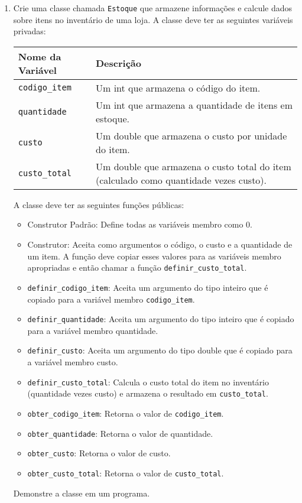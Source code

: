 \documentclass[12pt]{article}
\begin{document}
\begin{enumerate}
  \item Crie uma classe chamada \texttt{Estoque} que armazene informações e calcule dados sobre itens no inventário de uma loja. A classe deve ter as seguintes variáveis privadas:

    \begin{tabular}{|l|p{.7\linewidth}|}
      \hline
      Nome da Variável & Descrição \\
      \hline
      \texttt{codigo\_item} & Um int que armazena o código do item. \\
      \texttt{quantidade} & Um int que armazena a quantidade de itens em estoque. \\
      \texttt{custo} & Um double que armazena o custo por unidade do item. \\
      \texttt{custo\_total} & Um double que armazena o custo total do item (calculado como quantidade vezes custo). \\
      \hline
    \end{tabular}

    A classe deve ter as seguintes funções públicas:
    \begin{itemize}
      \item Construtor Padrão: Define todas as variáveis membro como 0.
      \item Construtor: Aceita como argumentos o código, o custo e a quantidade de um item. A função deve copiar esses valores para as variáveis membro apropriadas e então chamar a função \texttt{definir\_custo\_total}.
      \item \texttt{definir\_codigo\_item}: Aceita um argumento do tipo inteiro que é copiado para a variável membro \texttt{codigo\_item}.
      \item \texttt{definir\_quantidade}: Aceita um argumento do tipo inteiro que é copiado para a variável membro quantidade.
      \item \texttt{definir\_custo}: Aceita um argumento do tipo double que é copiado para a variável membro custo.
      \item \texttt{definir\_custo\_total}: Calcula o custo total do item no inventário (quantidade vezes custo) e armazena o resultado em \texttt{custo\_total}.
      \item \texttt{obter\_codigo\_item}: Retorna o valor de \texttt{codigo\_item}.
      \item \texttt{obter\_quantidade}: Retorna o valor de quantidade.
      \item \texttt{obter\_custo}: Retorna o valor de custo.
      \item \texttt{obter\_custo\_total}: Retorna o valor de \texttt{custo\_total}.
    \end{itemize}
    Demonstre a classe em um programa.


\end{enumerate}
\end{document}
